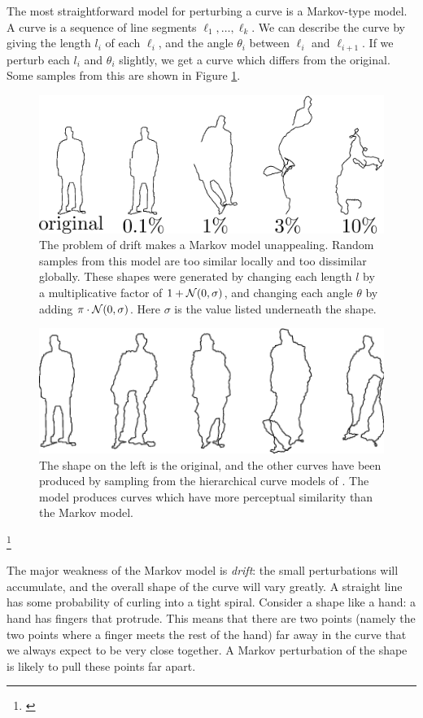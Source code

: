 The most straightforward model for perturbing a curve is a Markov-type
model. A curve is a sequence of line segments
$\ell_1,\dots,\ell_k$. We can describe the curve by giving the length
$l_i$ of each $\ell_i$, and the angle $\theta_i$ between $\ell_i$ and
$\ell_{i+1}$. If we perturb each $l_i$ and $\theta_i$ slightly, we
get a curve which differs from the original. Some samples from this
are shown in Figure \ref{fig-markov}.
\begin{figure}
  \centering
\includegraphics[width=120mm]{images/markov_new.png}
\caption{The problem of drift makes a Markov model unappealing. Random
  samples from this model are too similar locally and too dissimilar
  globally. These shapes were generated by changing each length $l$ by
  a multiplicative factor of $1 + {\mathcal N}(0,\sigma)$, and changing each
  angle $\theta$ by adding $\pi \cdot {\mathcal N}(0,\sigma )$. Here $\sigma$
  is the value listed underneath the shape.}
\label{fig-markov}
\end{figure}

\begin{figure}
  \centering
\includegraphics[width=120mm]{images/hcm.png}
\caption{The shape on the left is the original, and the other curves
  have been produced by sampling from the hierarchical curve models of
  . The model produces curves which have more perceptual
  similarity than the Markov model. }
\label{fig-hcm}
\end{figure}
\footnote{\cite{hcm}}

The major weakness of the Markov model is \emph{drift}: the small
perturbations will accumulate, and the overall shape of the curve will vary
greatly. A straight line has some probability of curling into a tight
spiral. Consider a shape like a hand: a hand has fingers that
protrude. This means that there are two points (namely the two points
where a finger meets the rest of the hand) far away in the curve that
we always expect to be very close together. A Markov perturbation of
the shape is likely to pull these points far apart.

